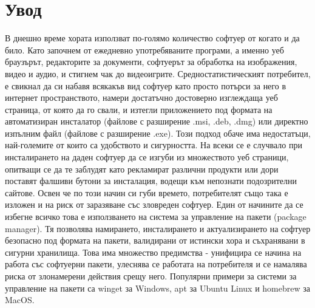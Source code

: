 \chapter*{Увод}

В днешно време хората използват по-голямо количество софтуер от когато и да
било. Като започнем от ежедневно употребяваните програми, а именно уеб
браузърът, редакторите за документи, софтуерът за обработка на изображения,
видео и аудио, и стигнем чак до видеоигрите. Средностатистическият потребител,
е свикнал да си набавя всякакъв вид софтуер като просто потърси за него в
интернет пространството, намери достатъчно достоверно изглеждаща уеб страница,
от която да го свали, и изтегли приложението под формата на автоматизиран
инсталатор (файлове с разширение .msi, .deb, .dmg) или директно изпълним файл
(файлове с разширение .exe). Този подход обаче има недостатъци, най-големите от
които са удобството и сигурността. На всеки се е случвало при инсталирането на
даден софтуер да се изгуби из множеството уеб страници, опитващи се да те
заблудят като рекламират различни продукти или дори поставят фалшиви бутони за
инсталация, водещи към непознати подозрителни сайтове. Освен че по този начин си
губи времето, потребителят също така е изложен и на риск от заразяване със
зловреден софтуер. Един от начините да се избегне всичко това е използването на
система за управление на пакети (package manager). Тя позволява намирането,
инсталирането и актуализирането на софтуер безопасно под формата на пакети,
валидирани от истински хора и съхранявани в сигурни хранилища. Това има
множество предимства - унифицира се начина на работа със софтуерни пакети,
улеснява се работата на потребителя и се намалява риска от злонамерени действия
срещу него. Популярни примери за системи за управление на пакети са winget за
Windows, apt за Ubuntu Linux и homebrew за MacOS.

